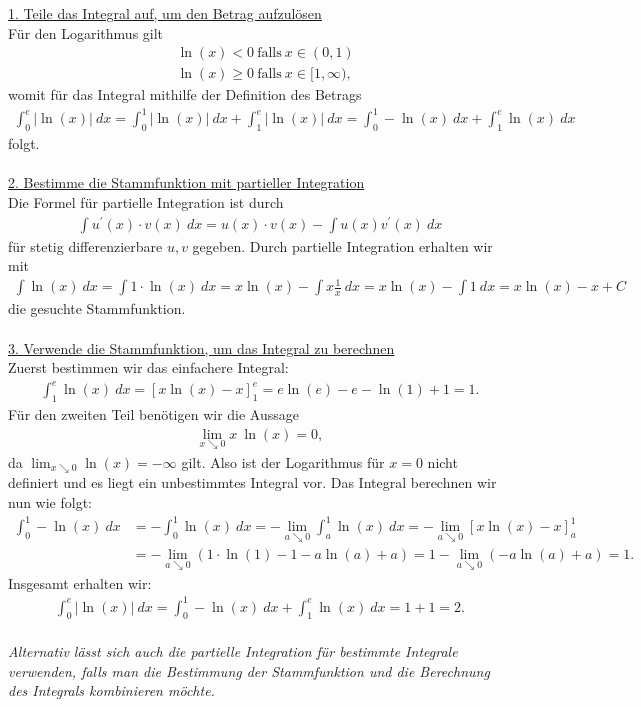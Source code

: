 \underline{1. Teile das Integral auf, um den Betrag aufzulösen}\\
Für den Logarithmus gilt
\begin{align*}
&\ln(x) < 0 \ \textrm{falls} \ x \in (0,1)\\
&\ln(x) \geq 0 \ \textrm{falls} \ x \in [1,\infty),
\end{align*}
womit für das Integral mithilfe der Definition des Betrags
\begin{align*}
\int_0^e |\ln(x) | \ dx
=
\int_0^1 |\ln(x) | \ dx
+
\int_1^e | \ln(x) | \ dx
=
\int_0^1 -\ln(x)  \ dx
+
\int_1^e  \ln(x)  \ dx
\end{align*}
folgt.\\
\\
\underline{2. Bestimme die Stammfunktion mit partieller Integration}\\
Die Formel für partielle Integration ist durch
\begin{align*}
\int u^\prime(x) \cdot v(x) \ dx = u(x) \cdot v(x) - \int u(x) v^\prime(x)\ dx
\end{align*}
für stetig differenzierbare $ u,v $ gegeben.
Durch partielle Integration erhalten wir mit
\begin{align*}
\int \ln(x) \ dx
=
\int 1 \cdot \ln(x) \ dx
= 
x \ln(x) - \int x \frac{1}{x} \ dx
=
x \ln(x) - \int 1 \ dx
= x \ln (x) - x + C
\end{align*}
die gesuchte Stammfunktion.\\
\\
\underline{3. Verwende die Stammfunktion, um das Integral zu berechnen}\\
Zuerst bestimmen wir das einfachere Integral:
\begin{align*}
\int_1^e  \ln(x)  \ dx
= \left[
x \ln(x) - x
\right]_1^e
= 
e \ln(e) - e - \ln(1)  +1 
= 
1.
\end{align*}
Für den zweiten Teil benötigen wir die Aussage
\begin{align*}
\lim \limits_{x \searrow 0} x \ \ln(x) = 0,
\end{align*}
da $ \lim_{x \searrow 0 } \ln(x) = - \infty$ gilt.
Also ist der Logarithmus für $ x = 0 $ nicht definiert und es liegt ein unbestimmtes Integral vor. 
Das Integral berechnen wir nun wie folgt:
\begin{align*}
\int_0^1 -\ln(x)  \ dx
&=
- \int_0^1 \ln(x)  \ dx
=
- \lim \limits_{a \searrow 0} \int_a^1 \ln(x) \ dx
=
- \lim \limits_{a \searrow 0} \left[
x \ln (x) - x
\right]_a^1\\
&=
- \lim \limits_{a \searrow 0} (1 \cdot \ln(1) - 1 - a \ln (a) +a )
=
1 - \lim \limits_{a \searrow 0} (-a \ln(a) +a)
=
1. 
\end{align*}
Insgesamt erhalten wir:
\begin{align*}
\int_0^e |\ln(x) | \ dx
=
\int_0^1 -\ln(x)  \ dx
+
\int_1^e  \ln(x)  \ dx
= 1 + 1 = 2.
\end{align*}
\ \\
\textit{
Alternativ lässt sich auch die partielle Integration für bestimmte Integrale verwenden, falls man die Bestimmung der Stammfunktion und die Berechnung des Integrals kombinieren möchte.
}

\newpage